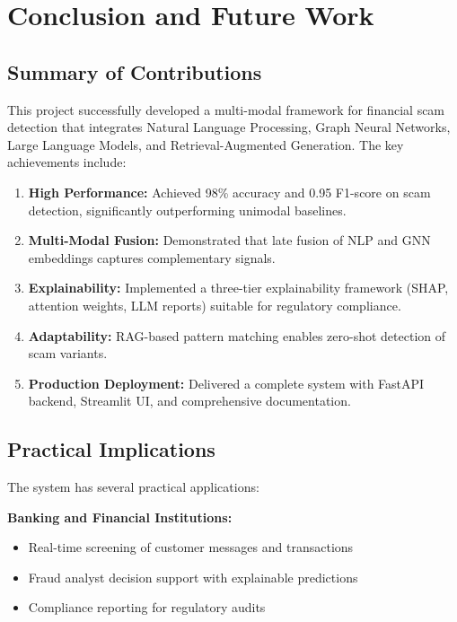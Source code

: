 \section{Conclusion and Future Work}

\subsection{Summary of Contributions}

This project successfully developed a multi-modal framework for financial scam detection that integrates Natural Language Processing, Graph Neural Networks, Large Language Models, and Retrieval-Augmented Generation. The key achievements include:

\begin{enumerate}
    \item \textbf{High Performance:} Achieved 98\% accuracy and 0.95 F1-score on scam detection, significantly outperforming unimodal baselines.
    \item \textbf{Multi-Modal Fusion:} Demonstrated that late fusion of NLP and GNN embeddings captures complementary signals.
    \item \textbf{Explainability:} Implemented a three-tier explainability framework (SHAP, attention weights, LLM reports) suitable for regulatory compliance.
    \item \textbf{Adaptability:} RAG-based pattern matching enables zero-shot detection of scam variants.
    \item \textbf{Production Deployment:} Delivered a complete system with FastAPI backend, Streamlit UI, and comprehensive documentation.
\end{enumerate}

\subsection{Practical Implications}

The system has several practical applications:

\textbf{Banking and Financial Institutions:}
\begin{itemize}
    \item Real-time screening of customer messages and transactions
    \item Fraud analyst decision support with explainable predictions
    \item Compliance reporting for regulatory audits
\end{itemize}

